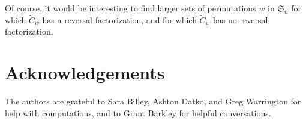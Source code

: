 \documentclass[12pt]{amsart}
\theoremstyle{definition}
\numberwithin{equation}{section}
\newcommand{\sn}{\mathfrak{S}_n}
\newcommand{\wtc}[2]{\widetilde{C}_{#1}}
\begin{document}
\vspace*{8mm}

Of course, it would be interesting to find larger sets of permutations $w$ in $\sn$ for which $\wtc wq$ has a reversal factorization,
and for which $\wtc wq$ has no reversal factorization.

\section{Acknowledgements}
The authors are grateful to Sara Billey, Ashton Datko, and Greg Warrington for help with computations, and to Grant Barkley for helpful conversations.

\end{document}
